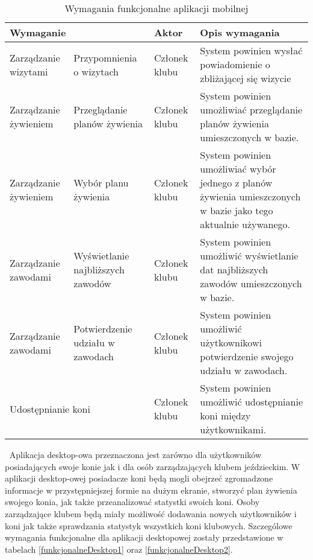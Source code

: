 \documentclass[12pt,twoside]{report}
\begin{document}
\renewcommand{\arraystretch}{1.8}
\begin{table}[h!]
	\centering
	\begin{tabular}{|p{3cm}|p{3cm}|p{4cm}|p{6cm}|}			
		\hline
		\multicolumn{2}{|l|}{Wymaganie} & Aktor & Opis wymagania\\
		\hline
		Zarządzanie wizytami & Przypomnienia o wizytach& Członek klubu & System powinien wysłać powiadomienie o zbliżającej się wizycie\\
		\hline
		Zarządzanie żywieniem & Przeglądanie planów żywienia & Członek klubu & System powinien umożliwiać przeglądanie planów żywienia umieszczonych w bazie.\\
		\hline
		Zarządzanie żywieniem & Wybór planu żywienia & Członek klubu & System powinien umożliwiać wybór jednego z planów żywienia umieszczonych w bazie jako tego aktualnie używanego.\\
		\hline
		Zarządzanie zawodami & Wyświetlanie najbliższych zawodów & Członek klubu & System powinien umożliwić wyświetlanie dat najbliższych zawodów umieszczonych w bazie.\\
		\hline
		Zarządzanie zawodami & Potwierdzenie udziału w zawodach & Członek klubu & System powinien umożliwić użytkownikowi potwierdzenie swojego udziału w zawodach.\\
		\hline
		\multicolumn{2}{|l|}{Udostępnianie koni}&Członek klubu& System powinien umożliwić udostępnianie koni między użytkownikami.\\
		\hline
	\end{tabular}
	\caption{Wymagania funkcjonalne aplikacji mobilnej}
	\label{funkcjonalneMobilki2}
\end{table}
\newpage
$\ $
\newpage
Aplikacja desktop-owa przeznaczona jest zarówno dla użytkowników posiadających swoje konie jak i dla osób zarządzających klubem jeździeckim. W aplikacji desktop-owej posiadacze koni będą mogli obejrzeć zgromadzone informacje w przystępniejszej formie na dużym ekranie, stworzyć plan żywienia swojego konia, jak także przeanalizować statystki swoich koni. Osoby zarządzające klubem będą miały możliwość dodawania nowych użytkowników i koni jak także sprawdzania statystyk wszystkich koni klubowych. Szczególowe wymagania funkcjonalne dla aplikacji desktopowej zostały przedstawione w tabelach \ref{funkcjonalneDesktop1} oraz \ref{funkcjonalneDesktop2}.
\renewcommand{\arraystretch}{1.8}
\end{document}
